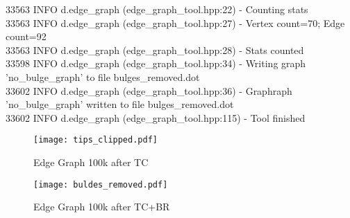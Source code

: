 \documentclass[14pt]{article}
\begin{document}
{{  33563  INFO d.edge\_graph (edge\_graph\_tool.hpp:22) - Counting stats \\
  33563  INFO d.edge\_graph (edge\_graph\_tool.hpp:27) - Vertex count=70; Edge count=92 \\
  33563  INFO d.edge\_graph (edge\_graph\_tool.hpp:28) - Stats counted \\
  33598  INFO d.edge\_graph (edge\_graph\_tool.hpp:34) - Writing graph 'no\_bulge\_graph' to file bulges\_removed.dot \\
  33602  INFO d.edge\_graph (edge\_graph\_tool.hpp:36) - Graphraph 'no\_bulge\_graph' written to file bulges\_removed.dot \\
  33602  INFO d.edge\_graph (edge\_graph\_tool.hpp:115) - Tool finished \\
}}


\newpage

\begin{figure}
\begin{center}
\texttt{[image: tips\_clipped.pdf]}
\end{center}
\caption{Edge Graph 100k after TC}
\end{figure}

\newpage

\begin{figure}
\begin{center}
\texttt{[image: buldes\_removed.pdf]}
\end{center}
\caption{Edge Graph 100k after TC+BR}
\end{figure}
\end{document}
